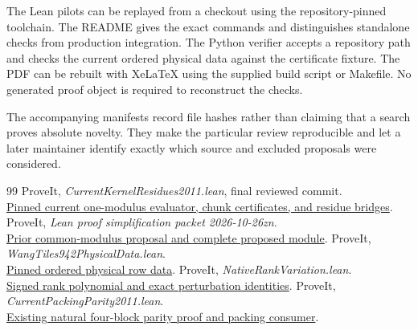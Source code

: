 \documentclass[11pt,a4paper]{article}
\begin{document}
The Lean pilots can be replayed from a checkout using the repository-pinned toolchain. The README gives the exact commands and distinguishes standalone checks from production integration. The Python verifier accepts a repository path and checks the current ordered physical data against the certificate fixture. The PDF can be rebuilt with XeLaTeX using the supplied build script or Makefile. No generated proof object is required to reconstruct the checks.

The accompanying manifests record file hashes rather than claiming that a search proves absolute novelty. They make the particular review reproducible and let a later maintainer identify exactly which source and excluded proposals were considered.

\clearpage
\begin{thebibliography}{99}
\small
{}
ProveIt, \emph{CurrentKernelResidues2011.lean}, final reviewed commit.\\
\href{https://github.com/VladimirReshetnikov/ProveIt/blob/3b51c69d42ff99bc420698532af3fe1d1f9bd356/Computability/DiophantineConsistency/Lean/DiophantineConsistency/CurrentKernelResidues2011.lean}{Pinned current one-modulus evaluator, chunk certificates, and residue bridges}.
ProveIt, \emph{Lean proof simplification packet 2026-10-26zn}.\\
\href{https://github.com/VladimirReshetnikov/ProveIt/tree/3b51c69d42ff99bc420698532af3fe1d1f9bd356/Computability/DiophantineConsistency/research/lean-proof-simplification/2026-10-26zn}{Prior common-modulus proposal and complete proposed module}.
ProveIt, \emph{WangTiles942PhysicalData.lean}.\\
\href{https://github.com/VladimirReshetnikov/ProveIt/blob/3b51c69d42ff99bc420698532af3fe1d1f9bd356/Computability/DiophantineConsistency/Lean/DiophantineConsistency/WangTiles942PhysicalData.lean}{Pinned ordered physical row data}.
ProveIt, \emph{NativeRankVariation.lean}.\\
\href{https://github.com/VladimirReshetnikov/ProveIt/blob/3b51c69d42ff99bc420698532af3fe1d1f9bd356/Computability/DiophantineConsistency/Lean/DiophantineConsistency/NativeRankVariation.lean}{Signed rank polynomial and exact perturbation identities}.
ProveIt, \emph{CurrentPackingParity2011.lean}.\\
\href{https://github.com/VladimirReshetnikov/ProveIt/blob/3b51c69d42ff99bc420698532af3fe1d1f9bd356/Computability/DiophantineConsistency/Lean/DiophantineConsistency/CurrentPackingParity2011.lean}{Existing natural four-block parity proof and packing consumer}.

\end{thebibliography}
\end{document}
